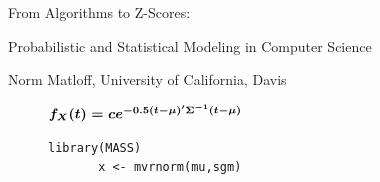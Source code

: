 
\pagecolor{MidnightBlue}
\color{white}

\begin{center}
{\Huge From Algorithms to Z-Scores: 

\bigskip

Probabilistic and Statistical Modeling in Computer Science}

\bigskip

{\LARGE Norm Matloff, University of California, Davis}

\medskip

\end{center}

\vspace{0.4in}

\begin{center}
\begin{figure}[ht]
\color{white}
   \begin{minipage}[b]{0.55\linewidth}
       \Large
       $
       \mbox{\boldmath$ f_X(t) = c e^{-0.5 (t-\mu)'\Sigma^{-1}(t-\mu)}$ } 
       $
   \end{minipage}
   \hspace{0.1in}
   \begin{minipage}[b]{0.58\linewidth}
       {\bf
       \begin{Verbatim}[fontsize=\relsize{+1}]
       library(MASS) 
       x <- mvrnorm(mu,sgm)
       \end{Verbatim}
       }
   \end{minipage}
\end{figure}
\end{center}

